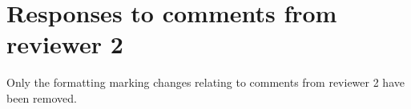 \documentclass[]{article}
\begin{document}
\section*{Responses to comments from reviewer 2}

Only the formatting marking changes relating to comments from reviewer
2 have been removed.
\end{document}
